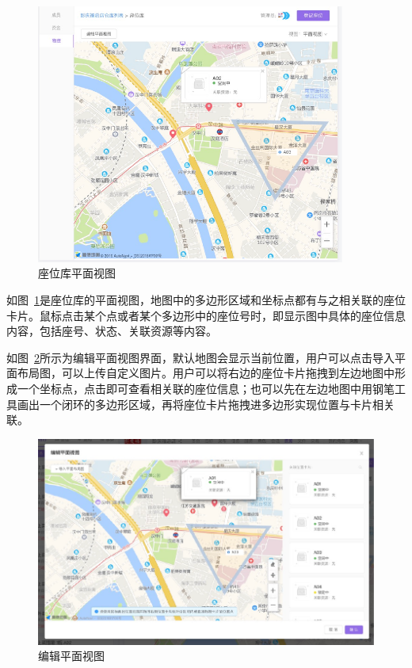 \begin{figure}[htbp!]
    \centering
    \includegraphics[width=4in]{FIGs/chapter4/seat_map.pdf}
    \caption{座位库平面视图}\label{fig_seat_map}
\end{figure}

如图~\ref{fig_seat_map}是座位库的平面视图，地图中的多边形区域和坐标点都有与之相关联的座位卡片。鼠标点击某个点或者某个多边形中的座位号时，即显示图中具体的座位信息内容，包括座号、状态、关联资源等内容。

如图~\ref{fig_seat_map_edit}所示为编辑平面视图界面，默认地图会显示当前位置，用户可以点击导入平面布局图，可以上传自定义图片。用户可以将右边的座位卡片拖拽到左边地图中形成一个坐标点，点击即可查看相关联的座位信息；也可以先在左边地图中用钢笔工具画出一个闭环的多边形区域，再将座位卡片拖拽进多边形实现位置与卡片相关联。

\begin{figure}[htbp!]
    \centering
    \includegraphics[width=5in]{FIGs/chapter4/seat_map_edit.pdf}
    \caption{编辑平面视图}\label{fig_seat_map_edit}
\end{figure}


